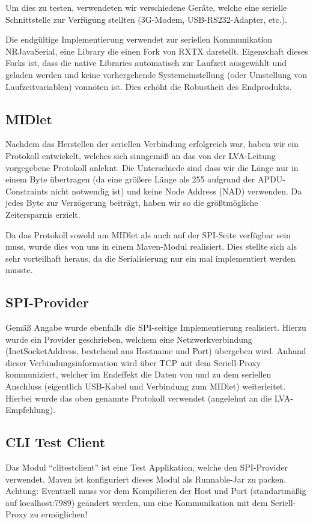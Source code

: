 \documentclass[paper=a4, fontsize=11pt]{scrartcl}
\begin{document}
Um dies zu testen, verwendeten wir verschiedene Geräte, welche eine serielle Schnittstelle zur Verfügung stellten (3G-Modem, USB-RS232-Adapter, etc.).

Die endgültige Implementierung verwendet zur seriellen Kommunikation NRJavaSerial, eine Library die einen Fork von RXTX darstellt. Eigenschaft dieses Forks ist, dass die native Libraries automatisch zur Laufzeit ausgewählt und geladen werden und keine vorhergehende Systemeinstellung (oder Umstellung von Laufzeitvariablen) vonnöten ist. Dies erhöht die Robustheit des Endprodukts.

\subsection{MIDlet}
Nachdem das Herstellen der seriellen Verbindung erfolgreich war, haben wir ein Protokoll entwickelt, welches sich sinngemäß an das von der LVA-Leitung vorgegebene Protokoll anlehnt. Die Unterschiede sind dass wir die Länge nur in einem Byte übertragen (da eine größere Länge als 255 aufgrund der APDU-Constraints nicht notwendig ist) und keine Node Address (NAD) verwenden. Da jedes Byte zur Verzögerung beiträgt, haben wir so die größtmögliche Zeitersparnis erzielt.

Da das Protokoll sowohl am MIDlet als auch auf der SPI-Seite verfügbar sein muss, wurde dies von uns in einem Maven-Modul realisiert. Dies stellte sich als sehr vorteilhaft heraus, da die Serialisierung nur ein mal implementiert werden musste.

\subsection{SPI-Provider}
Gemäß Angabe wurde ebenfalls die SPI-seitige Implementierung realisiert. Hierzu wurde ein Provider geschrieben, welchem eine Netzwerkverbindung (InetSocketAddress, bestehend aus Hostname und Port) übergeben wird. Anhand dieser Verbindungsinformation wird über TCP mit dem Seriell-Proxy kommuniziert, welcher im Endeffekt die Daten von und zu dem seriellen Anschluss (eigentlich USB-Kabel und Verbindung zum MIDlet) weiterleitet. Hierbei wurde das oben genannte Protokoll verwendet (angelehnt an die LVA-Empfehlung).

\subsection{CLI Test Client}
Das Modul \enquote{clitestclient} ist eine Test Applikation, welche den SPI-Provider verwendet. Maven ist konfiguriert dieses Modul als Runnable-Jar zu packen. Achtung: Eventuell muss vor dem Kompilieren der Host und Port (standartmäßig auf localhost:7989) geändert werden, um eine Kommunikation mit dem Seriell-Proxy zu ermöglichen!
\end{document}
